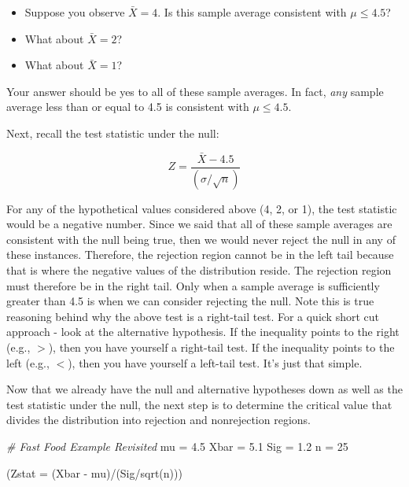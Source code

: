 \documentclass[
]{book}
\newenvironment{Shaded}{\begin{snugshade}}{\end{snugshade}}
\newcommand{\AttributeTok}[1]{\textcolor[rgb]{0.77,0.63,0.00}{#1}}
\newcommand{\CommentTok}[1]{\textcolor[rgb]{0.56,0.35,0.01}{\textit{#1}}}
\newcommand{\DecValTok}[1]{\textcolor[rgb]{0.00,0.00,0.81}{#1}}
\newcommand{\FloatTok}[1]{\textcolor[rgb]{0.00,0.00,0.81}{#1}}
\newcommand{\FunctionTok}[1]{\textcolor[rgb]{0.00,0.00,0.00}{#1}}
\newcommand{\NormalTok}[1]{#1}
\newcommand{\OtherTok}[1]{\textcolor[rgb]{0.56,0.35,0.01}{#1}}
\newcommand{\SpecialCharTok}[1]{\textcolor[rgb]{0.00,0.00,0.00}{#1}}
\begin{document}
\begin{itemize}
\item
  Suppose you observe \(\bar{X}=4\). Is this sample average consistent with \(\mu \leq 4.5\)?
\item
  What about \(\bar{X}=2\)?
\item
  What about \(\bar{X}=1\)?
\end{itemize}

Your answer should be yes to all of these sample averages. In fact, \emph{any} sample average less than or equal to 4.5 is consistent with \(\mu \leq 4.5\).

Next, recall the test statistic under the null:

\[ Z = \frac{\bar{X}-4.5}{\left(\sigma / \sqrt{n} \right)}\]

For any of the hypothetical values considered above (4, 2, or 1), the test statistic would be a negative number. Since we said that all of these sample averages are consistent with the null being true, then we would never reject the null in any of these instances. Therefore, the rejection region cannot be in the left tail because that is where the negative values of the distribution reside. The rejection region must therefore be in the right tail. Only when a sample average is sufficiently greater than 4.5 is when we can consider rejecting the null. Note this is true reasoning behind why the above test is a right-tail test. For a quick short cut approach - look at the alternative hypothesis. If the inequality points to the right (e.g., \(>\)), then you have yourself a right-tail test. If the inequality points to the left (e.g., \(<\)), then you have yourself a left-tail test. It's just that simple.

Now that we already have the null and alternative hypotheses down as well as the test statistic under the null, the next step is to determine the critical value that divides the distribution into rejection and nonrejection regions.

\begin{Shaded}
\begin{Highlighting}[]
\CommentTok{\# Fast Food Example Revisited}
\NormalTok{mu }\OtherTok{=} \FloatTok{4.5}
\NormalTok{Xbar }\OtherTok{=} \FloatTok{5.1}
\NormalTok{Sig }\OtherTok{=} \FloatTok{1.2}
\NormalTok{n }\OtherTok{=} \DecValTok{25}

\NormalTok{(}\AttributeTok{Zstat =}\NormalTok{ (Xbar }\SpecialCharTok{{-}}\NormalTok{ mu)}\SpecialCharTok{/}\NormalTok{(Sig}\SpecialCharTok{/}\FunctionTok{sqrt}\NormalTok{(n)))}
\end{Highlighting}
\end{Shaded}
\end{document}
